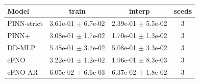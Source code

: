 \begin{tabular}{lccc}
\toprule
Model & train & interp & seeds \\
\midrule
PINN-strict & 3.61e-01 $\pm$ 6.7e-02 & 2.39e-01 $\pm$ 5.5e-02 & 3 \\
PINN+ & 3.08e-01 $\pm$ 1.7e-02 & 1.70e-01 $\pm$ 1.3e-02 & 3 \\
DD-MLP & 5.48e-01 $\pm$ 3.7e-02 & 5.08e-01 $\pm$ 3.3e-02 & 3 \\
cFNO & 3.22e-01 $\pm$ 1.2e-02 & 1.96e-01 $\pm$ 8.3e-03 & 3 \\
cFNO-AR & 6.05e-02 $\pm$ 6.6e-03 & 6.37e-02 $\pm$ 1.8e-02 & 3 \\
\bottomrule
\end{tabular}
